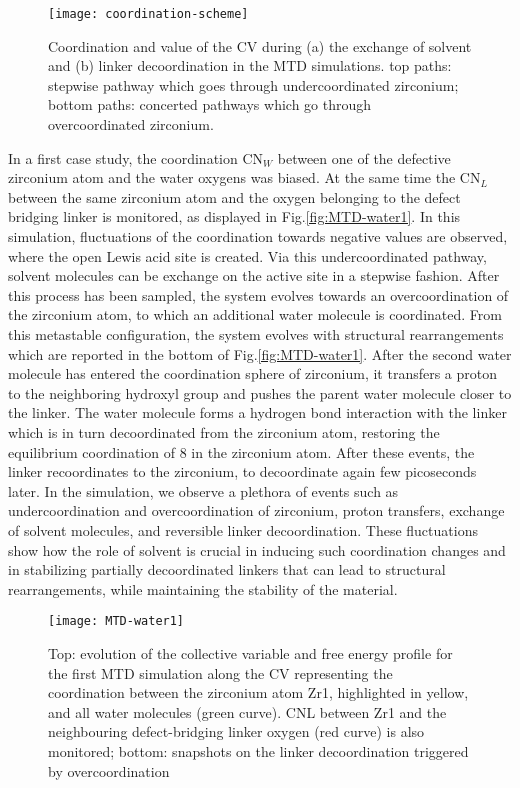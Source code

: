 \begin{figure}[!htbp]
	\centering
	\texttt{[image: coordination-scheme]}
	\caption{ Coordination and value of the CV during (a) the exchange of solvent and (b) linker decoordination in the MTD simulations. top paths: stepwise pathway which goes through undercoordinated zirconium; bottom paths: concerted pathways which go through overcoordinated zirconium.}
	\label{fig:coordination-scheme}
\end{figure}
In a first case study, the coordination CN$_W$ between one of the defective zirconium atom and the water oxygens was biased. At the same time the CN$_L$ between the same zirconium atom and the oxygen belonging to the defect bridging linker is monitored, as displayed in Fig.\ref{fig:MTD-water1}. In this simulation, fluctuations of the coordination towards negative values are observed, where the open Lewis acid site is created. Via this undercoordinated pathway, solvent molecules can be exchange on the active site in a stepwise fashion. After this process has been sampled, the system evolves towards an overcoordination of the zirconium atom, to which an additional water molecule is coordinated. From this metastable configuration, the system evolves with structural rearrangements which are reported in the bottom of Fig.\ref{fig:MTD-water1}. After the second water molecule has entered the coordination sphere of zirconium, it transfers a proton to the neighboring hydroxyl group and pushes the parent water molecule closer to the linker. The water molecule forms a hydrogen bond interaction with the linker which is in turn decoordinated from the zirconium atom, restoring the equilibrium coordination of 8 in the zirconium atom. After these events, the linker recoordinates to the zirconium, to decoordinate again few picoseconds later. In the simulation, we observe a plethora of events such as undercoordination and overcoordination of zirconium, proton transfers, exchange of solvent molecules, and reversible linker decoordination. These fluctuations show how the role of solvent is crucial in inducing such coordination changes and in stabilizing partially decoordinated linkers that can lead to structural rearrangements, while maintaining the stability of the material.  
\begin{figure}[!htbp]
	\centering
	\texttt{[image: MTD-water1]}
	\caption{Top: evolution of the collective variable and free energy profile for the first MTD simulation along the CV representing the coordination between the zirconium atom Zr1, highlighted in yellow, and all water molecules (green curve). CNL between Zr1 and the neighbouring defect-bridging linker oxygen (red curve) is also monitored; bottom: snapshots on the linker decoordination triggered by overcoordination}
	\label{fig: MTD-water1}
\end{figure}
